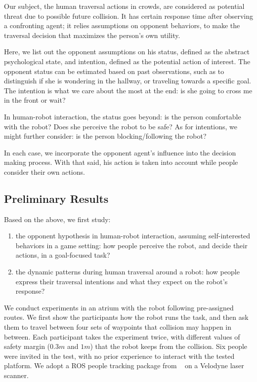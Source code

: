 \documentclass[conference]{IEEEtran}
\begin{document}
Our subject, the human traversal actions in crowds, are considered as potential 
threat due to possible future collision. It has certain response time after 
observing a confronting agent; it relies assumptions on 
opponent behaviors, to make the traversal decision that maximizes the person's 
own utility. 

Here, we list out the opponent assumptions on his status, defined as the 
abstract psychological state, and intention, defined as the potential 
action of interest. The opponent status can be estimated based on past 
observations, such as to distinguish if she is wondering in the hallway, or 
traveling towards a specific goal. The intention is what we care about the most at 
the end: is she going to cross me in the front or wait?

In human-robot interaction, the status goes beyond: is the person comfortable 
with the robot? Does she perceive the robot 
to be safe? As for intentions, we might further consider: is the person 
blocking/following the robot? 

In each case, we incorporate the opponent agent's influence into the decision 
making process. With that said, his action is taken into account while people 
consider their own actions. 
\vspace{-.3em}
\subsection{Preliminary Results}
Based on the above, we first study:
\begin{enumerate}
\item the opponent hypothesis in human-robot interaction, assuming 
  self-interested behaviors in a game setting: how people perceive the robot, 
  and decide their actions, in a goal-focused task?
\item the dynamic patterns during human traversal around a robot: how people 
  express their traversal intentions and what they expect on the robot's 
  response?
\end{enumerate}

We conduct experiments in an atrium with the robot following pre-assigned 
routes. We first show the participants how the robot runs the task, and then 
ask them to travel between four sets of waypoints that collision may happen in 
between. Each participant takes the experiment twice, with different values of 
safety margin ($0.3m$ and $1m$) that the robot keeps from the collision. Six 
people were invited in the test, with no prior experience to interact with the 
tested platform. We adopt a ROS people tracking package from ~\cite{leigh2015person}
on a Velodyne laser scanner. 
\end{document}
